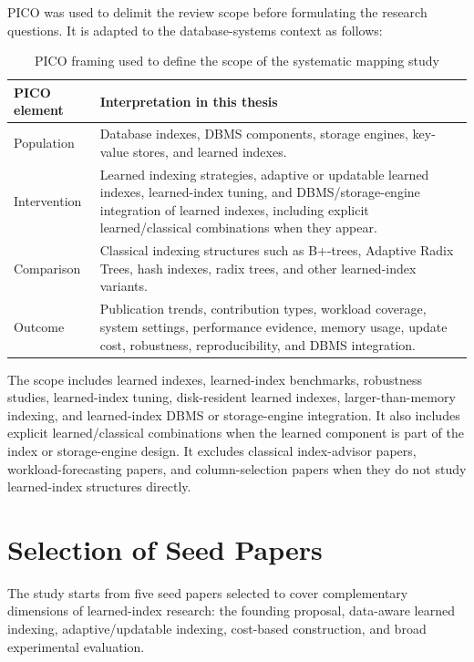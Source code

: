 \documentclass[a4paper, 12pt, twoside]{report}
\begin{document}
PICO was used to delimit the review scope before formulating the research questions. It is adapted to the database-systems context as follows:

\begin{table}[h]
\begin{center}
\begin{tabular}{|p{3cm}|p{10cm}|}
\hline
\textbf{PICO element} & \textbf{Interpretation in this thesis} \\
\hline
Population & Database indexes, DBMS components, storage engines, key-value stores, and learned indexes. \\
\hline
Intervention & Learned indexing strategies, adaptive or updatable learned indexes, learned-index tuning, and DBMS/storage-engine integration of learned indexes, including explicit learned/classical combinations when they appear. \\
\hline
Comparison & Classical indexing structures such as B+-trees, Adaptive Radix Trees, hash indexes, radix trees, and other learned-index variants. \\
\hline
Outcome & Publication trends, contribution types, workload coverage, system settings, performance evidence, memory usage, update cost, robustness, reproducibility, and DBMS integration. \\
\hline
\end{tabular}
\end{center}
\caption{PICO framing used to define the scope of the systematic mapping study}
\label{tab:pico}
\end{table}

The scope includes learned indexes, learned-index benchmarks, robustness studies, learned-index tuning, disk-resident learned indexes, larger-than-memory indexing, and learned-index DBMS or storage-engine integration. It also includes explicit learned/classical combinations when the learned component is part of the index or storage-engine design. It excludes classical index-advisor papers, workload-forecasting papers, and column-selection papers when they do not study learned-index structures directly.

\section{Selection of Seed Papers}

The study starts from five seed papers selected to cover complementary dimensions of learned-index research: the founding proposal, data-aware learned indexing, adaptive/updatable indexing, cost-based construction, and broad experimental evaluation.
\end{document}
